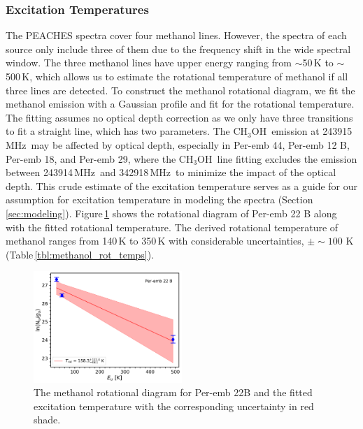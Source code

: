\documentclass[twocolumn]{aastex62}
\newcommand{\mhz}{\mbox{\,MHz}}
\newcommand{\methanol}{\mbox{CH$_{3}$OH}}
\begin{document}
\subsubsection{Excitation Temperatures}
The PEACHES spectra cover four methanol lines.  However, the spectra of each source only include three of them due to the frequency shift in the wide spectral window.  The three methanol lines have upper energy ranging from $\sim$50\,K to $\sim$500\,K, which allows us to estimate the rotational temperature of methanol if all three lines are detected.  To construct the methanol rotational diagram, we fit the methanol emission with a Gaussian profile and fit for the rotational temperature.  The fitting assumes no optical depth correction as we only have three transitions to fit a straight line, which has two parameters.  The \methanol\ emission at 243915\mhz\ may be affected by optical depth, especially in Per-emb 44, Per-emb 12 B, Per-emb 18, and Per-emb 29, where the \methanol\ line fitting excludes the emission between 243914\mhz\ and 342918\mhz\ to minimize the impact of the optical depth.  This crude estimate of the excitation temperature serves as a guide for our assumption for excitation temperature in modeling the spectra (Section\,\ref{sec:modeling}).  Figure\,\ref{fig:rot_dia_example} shows the rotational diagram of Per-emb 22 B along with the fitted rotational temperature.  The derived rotational temperature of methanol ranges from 140\,K to 350\,K with considerable uncertainties, $\pm \sim 100$ K (Table\,\ref{tbl:methanol_rot_temps}).

\begin{figure}[htbp!]
  \centering
  \includegraphics[width=0.5\textwidth]{Set1_ID03_2_polyfit.pdf}
  \caption{The methanol rotational diagram for Per-emb 22B and the fitted excitation temperature with the corresponding uncertainty in red shade.}
  \label{fig:rot_dia_example}
\end{figure}
\end{document}
